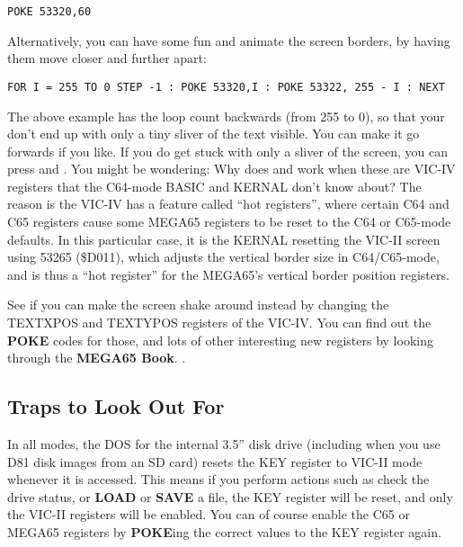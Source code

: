 \begin{tcolorbox}[colback=black,coltext=white]
\verbatimfont{\codefont}
\begin{verbatim}
POKE 53320,60
\end{verbatim}
\end{tcolorbox}

Alternatively, you can have some fun and animate the screen borders, by having them move closer and further apart:

\begin{tcolorbox}[colback=black,coltext=white]
\verbatimfont{\codefont}
\begin{verbatim}
FOR I = 255 TO 0 STEP -1 : POKE 53320,I : POKE 53322, 255 - I : NEXT
\end{verbatim}
\end{tcolorbox}

The above example has the loop count backwards (from 255 to 0), so that your don't end up with only a
tiny sliver of the text visible. You can make it go forwards if you like. If you do get stuck with only a sliver
of the screen, you can press  and . You might be wondering: Why does 
and  work when these are VIC-IV registers that the C64-mode BASIC and KERNAL
don't know about?  The reason is the VIC-IV has a feature called ``hot registers'',
where certain C64 and C65 registers cause some MEGA65 registers to be reset to the C64 or
C65-mode defaults. In this particular case, it is the KERNAL resetting the VIC-II screen using
53265 (\$D011), which adjusts the vertical border size in C64/C65-mode, and is thus a ``hot register''
for the MEGA65's vertical border position registers.

See if you can make the screen shake around instead by changing the TEXTXPOS and TEXTYPOS registers of
the VIC-IV.  You can find out the {\bf POKE} codes for those, and lots of other interesting new registers
by looking through
\ifdefined\printmanual
 the {\bf MEGA65 Book}.
\else
 .
\fi


\subsection{Traps to Look Out For}

In all modes, the DOS for the internal 3.5'' disk drive (including when you use D81 disk images from
an SD card) resets the KEY register to VIC-II mode whenever it is accessed. This means if you perform actions
such as check the drive status, or {\bf LOAD} or {\bf SAVE} a file, the KEY register will be reset, and only the VIC-II registers
will be enabled. You can of course enable the C65 or MEGA65 registers by {\bf POKE}ing the correct values
to the KEY register again.

